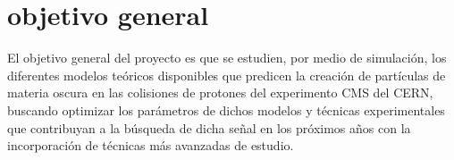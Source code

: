 \chapter{objetivo general}

El objetivo general del proyecto es que se estudien, por medio de simulación, los diferentes modelos teóricos disponibles que predicen la creación de partículas de materia oscura en las colisiones de protones del experimento CMS del CERN, buscando optimizar los parámetros de dichos modelos y técnicas experimentales que contribuyan a la búsqueda de dicha señal en los próximos años con la incorporación de técnicas más avanzadas de estudio.
